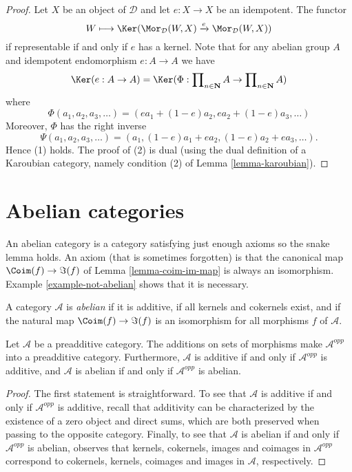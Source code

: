 \begin{proof}
Let $X$ be an object of $\mathcal{D}$ and let $e : X \to X$ be an idempotent.
The functor
$$
W \longmapsto \Ker(
\Mor_\mathcal{D}(W, X)
\xrightarrow{e}
\Mor_\mathcal{D}(W, X)
)
$$
if representable if and only if $e$ has a kernel. Note that for any
abelian group $A$ and idempotent endomorphism $e : A \to A$ we have
$$
\Ker(e : A \to A)
= \Ker(\Phi :
\prod\nolimits_{n \in \mathbf{N}} A
\to
\prod\nolimits_{n \in \mathbf{N}} A
)
$$
where
$$
\Phi(a_1, a_2, a_3, \ldots) = (ea_1 + (1 - e)a_2, ea_2 + (1 - e)a_3, \ldots)
$$
Moreover, $\Phi$ has the right inverse
$$
\Psi(a_1, a_2, a_3, \ldots) =
(a_1, (1 - e)a_1 + ea_2, (1 - e)a_2 + ea_3, \ldots).
$$
Hence (1) holds. The proof of (2) is dual (using the dual definition
of a Karoubian category, namely condition (2) of
Lemma \ref{lemma-karoubian}).
\end{proof}









\section{Abelian categories}
\label{section-abelian-categories}

\noindent
An abelian category is a category satisfying just enough axioms so the
snake lemma holds. An axiom (that is sometimes forgotten)
is that the canonical map $\Coim(f) \to \Im(f)$
of Lemma \ref{lemma-coim-im-map} is always an isomorphism.
Example \ref{example-not-abelian} shows that it is necessary.

\begin{definition}
\label{definition-abelian-category}
A category $\mathcal{A}$ is {\it abelian} if
it is additive, if all kernels and cokernels exist,
and if the natural map $\Coim(f) \to \Im(f)$
is an isomorphism for all morphisms $f$ of
$\mathcal{A}$.
\end{definition}

\begin{lemma}
\label{lemma-abelian-opposite}
Let $\mathcal{A}$ be a preadditive category.
The additions on sets of morphisms make
$\mathcal{A}^{opp}$ into a preadditive category.
Furthermore, $\mathcal{A}$ is additive if and only if $\mathcal{A}^{opp}$
is additive, and
$\mathcal{A}$ is abelian if and only if $\mathcal{A}^{opp}$ is abelian.
\end{lemma}

\begin{proof}
The first statement is straightforward.
To see that $\mathcal{A}$ is additive if and only if $\mathcal{A}^{opp}$
is additive, recall that additivity can be characterized by
the existence of a zero object and direct sums, which are both
preserved when passing to the opposite category.
Finally, to see that
$\mathcal{A}$ is abelian if and only if $\mathcal{A}^{opp}$ is abelian,
observes that kernels, cokernels, images and coimages in
$\mathcal{A}^{opp}$ correspond to
cokernels, kernels, coimages and images in $\mathcal{A}$,
respectively.
\end{proof}

